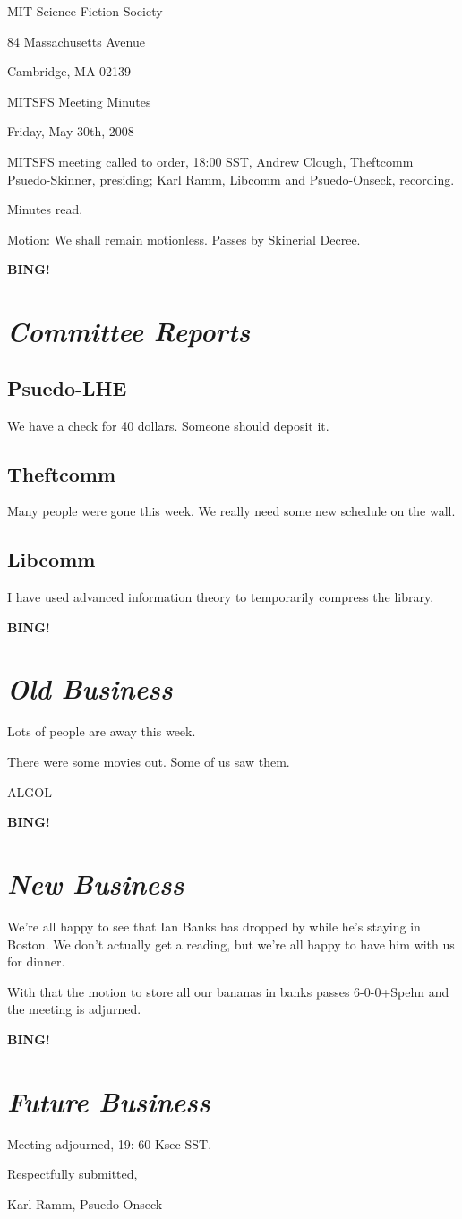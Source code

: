 \documentclass[10pt]{article}
\newcommand{\bing}{{\bf BING!} }
\newcommand{\goto}[1]{\bing \vskip 12pt \section*{{\em{#1}}}}
\begin{document}
\begin{center}

MIT Science Fiction Society

84 Massachusetts Avenue

Cambridge, MA 02139

\vspace{12pt}

MITSFS Meeting Minutes

Friday, May 30th, 2008

\end{center}

\vspace{18pt}

\setlength{\parskip}{6pt}

\noindent
MITSFS meeting called to order, 18:00 SST,
Andrew Clough, Theftcomm Psuedo-Skinner, presiding; Karl Ramm, Libcomm and Psuedo-Onseck, recording.

Minutes read.

Motion:  We shall remain motionless.  Passes by Skinerial Decree.

\goto{Committee Reports}

\subsection*{Psuedo-LHE}

We have a check for 40 dollars.  Someone should deposit it.

\subsection*{Theftcomm}

Many people were gone this week.  We really need some new schedule
on the wall.

\subsection*{Libcomm}

I have used advanced information theory to temporarily compress the library.

\goto{Old Business}

Lots of people are away this week.

There were some movies out.  Some of us saw them.

ALGOL

\goto{New Business}

We're all happy to see that Ian Banks has dropped by while he's 
staying in Boston.  We don't actually get a reading, but we're all
happy to have him with us for dinner.

With that the motion to store all our bananas in banks passes 6-0-0+Spehn and the meeting is adjurned.  

\goto{Future Business}

\noindent
Meeting adjourned, 19:-60 Ksec SST.

\vspace{18pt}

\centerline{Respectfully submitted,}
\centerline{Karl Ramm, Psuedo-Onseck}
\end{document}
